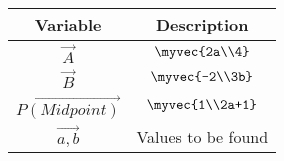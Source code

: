 \begin{tabular}[12pt]{ |c| c|}
    \hline
    \textbf{Variable} & \textbf{Description}\\ 
    \hline
	$\vec{A}$ & $\myvec{2a\\4}$\\
	\hline
	$\vec{B}$ & $\myvec{-2\\3b}$\\
	\hline
	$\vec{P(Midpoint)}$ & $\myvec{1\\2a+1}$\\
	\hline
	$\vec{a,b}$ & Values to be found\\
\end{tabular}
